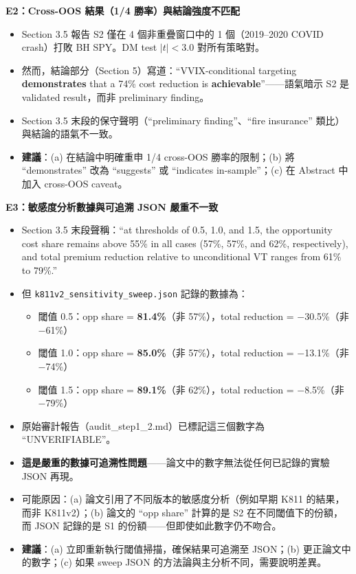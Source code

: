 \documentclass[12pt,a4paper]{article}
\begin{document}
\textcolor{errorred}{\textbf{E2：Cross-OOS 結果（1/4 勝率）與結論強度不匹配}}

\begin{itemize}[leftmargin=2em]
\item Section 3.5 報告 S2 僅在 4 個非重疊窗口中的 1 個（2019--2020 COVID crash）打敗 BH SPY。DM test $|t| < 3.0$ 對所有策略對。
\item 然而，結論部分（Section 5）寫道：``VVIX-conditional targeting \textbf{demonstrates} that a 74\% cost reduction is \textbf{achievable}''——語氣暗示 S2 是 validated result，而非 preliminary finding。
\item Section 3.5 末段的保守聲明（``preliminary finding''、``fire insurance'' 類比）與結論的語氣不一致。
\item \textbf{建議}：(a) 在結論中明確重申 1/4 cross-OOS 勝率的限制；(b) 將 ``demonstrates'' 改為 ``suggests'' 或 ``indicates in-sample''；(c) 在 Abstract 中加入 cross-OOS caveat。
\end{itemize}

\textcolor{errorred}{\textbf{E3：敏感度分析數據與可追溯 JSON 嚴重不一致}}

\begin{itemize}[leftmargin=2em]
\item Section 3.5 末段聲稱：``at thresholds of 0.5, 1.0, and 1.5, the opportunity cost share remains above 55\% in all cases (57\%, 57\%, and 62\%, respectively), and total premium reduction relative to unconditional VT ranges from 61\% to 79\%.''
\item 但 \texttt{k811v2\_sensitivity\_sweep.json} 記錄的數據為：
  \begin{itemize}
  \item 閾值 0.5：opp share = \textbf{81.4\%}（非 57\%），total reduction = $-$30.5\%（非 $-$61\%）
  \item 閾值 1.0：opp share = \textbf{85.0\%}（非 57\%），total reduction = $-$13.1\%（非 $-$74\%）
  \item 閾值 1.5：opp share = \textbf{89.1\%}（非 62\%），total reduction = $-$8.5\%（非 $-$79\%）
  \end{itemize}
\item 原始審計報告（audit\_step1\_2.md）已標記這三個數字為 ``UNVERIFIABLE''。
\item \textbf{這是嚴重的數據可追溯性問題}——論文中的數字無法從任何已記錄的實驗 JSON 再現。
\item 可能原因：(a) 論文引用了不同版本的敏感度分析（例如早期 K811 的結果，而非 K811v2）；(b) 論文的 ``opp share'' 計算的是 S2 在不同閾值下的份額，而 JSON 記錄的是 S1 的份額——但即使如此數字仍不吻合。
\item \textbf{建議}：(a) 立即重新執行閾值掃描，確保結果可追溯至 JSON；(b) 更正論文中的數字；(c) 如果 sweep JSON 的方法論與主分析不同，需要說明差異。
\end{itemize}
\end{document}
